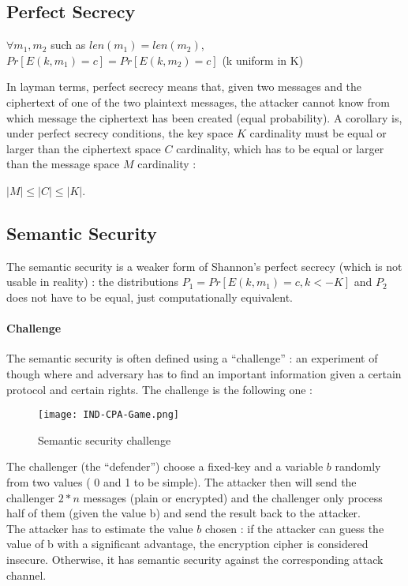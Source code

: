 \subsection{Perfect Secrecy}

\begin{mytheorem}
    $\forall m_1,m_2$ such as $len(m_1) = len(m_2)$, 
    $Pr[E(k,m_1) = c] = Pr[E(k,m_2) = c]$  \flushright (k uniform in K)
\end{mytheorem}

In layman terms, perfect secrecy means that, given two messages and the ciphertext of one of the two plaintext messages, the attacker cannot know from which message the ciphertext has been created (equal probability). A corollary is, under perfect secrecy conditions, the key space $K$ cardinality must be equal or larger than the ciphertext space $C$ cardinality, which has to be equal or larger than the message space $M$ cardinality :
\begin{mytheorem}
    $ |M| \leq |C| \leq |K| $. 
\end{mytheorem}


\subsection{Semantic Security}

The semantic security is a weaker form of Shannon's perfect secrecy (which is not usable in reality) : the distributions $P_1 = Pr[E(k,m_1) = c , k<- K]$ and $P_2$ does not have to be equal, just computationally equivalent.

\paragraph{Challenge}
The semantic security is often defined using a ``challenge'' : an experiment of though where and adversary has to find an important information given a certain protocol and certain rights. The challenge is the following one :

\begin{figure}[ht!]
	\centering
		\texttt{[image: IND-CPA-Game.png]}
	\caption{Semantic security challenge}
	\label{fig:SemanticSecurityChallenge}
\end{figure}

The challenger (the ``defender'') choose a fixed-key and a variable $b$ randomly from two values ( 0 and 1 to be simple). The attacker then will send the challenger $2*n$ messages (plain or encrypted) and the challenger only process half of them (given the value b) and send the result back to the attacker.\\
The attacker has to estimate the value $b$ chosen : if the attacker can guess the value of b with a significant advantage, the encryption cipher is considered insecure. Otherwise, it has semantic security against the corresponding attack channel.

